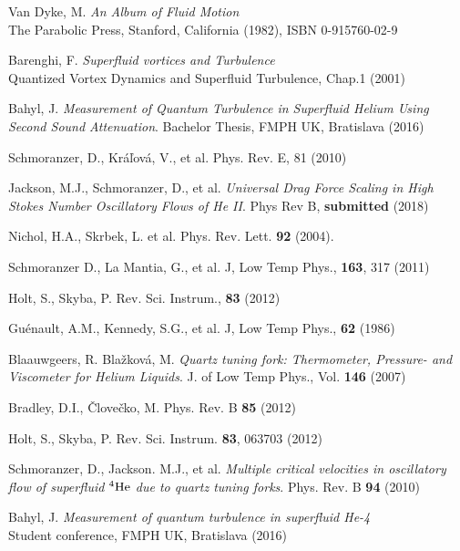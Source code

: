 \begin{thebibliography}{99}
	{\sc Van Dyke, M.}
	\emph{An Album of Fluid Motion}\\
	The Parabolic Press, Stanford, California (1982), ISBN 0-915760-02-9

	{\sc Barenghi, F.}
	\emph{Superfluid vortices and Turbulence}\\
	Quantized Vortex Dynamics and Superfluid Turbulence, Chap.1 (2001)

	{\sc Bahyl, J.}
	\emph{Measurement of Quantum Turbulence in Superfluid Helium Using Second Sound Attenuation}.
	Bachelor Thesis, FMPH UK, Bratislava (2016)

	{\sc Schmoranzer, D., Kráľová, V., et al.}
	\emph{}	Phys. Rev. E, 81 (2010)

	{\sc Jackson, M.J., Schmoranzer, D., et al.}
	\emph{Universal Drag Force Scaling in High Stokes Number Oscillatory Flows of He II}. Phys Rev B, \textbf{submitted} (2018)

	{\sc Nichol, H.A., Skrbek, L. et al.}
	\emph{} Phys. Rev. Lett. \textbf{92} (2004).

	{\sc Schmoranzer D., La Mantia, G., et al.}
	\emph{} J, Low Temp Phys., \textbf{163}, 317 (2011)


	{\sc Holt, S., Skyba, P.}
	\emph{} Rev. Sci. Instrum., \textbf{83} (2012)

	{\sc Guénault, A.M., Kennedy, S.G., et al.}
	\emph{} J, Low Temp Phys., \textbf{62} (1986)

	{\sc Blaauwgeers, R. Blažková, M.} 
	\emph{Quartz tuning fork: Thermometer, Pressure- and Viscometer for Helium Liquids}.
	J. of Low Temp Phys., Vol. \textbf{146} (2007)

	{\sc Bradley, D.I., Človečko, M.} 
	\emph{} Phys. Rev. B \textbf{85} (2012)

	{\sc Holt, S., Skyba, P.}
	\emph{} Rev. Sci. Instrum. \textbf{83}, 063703 (2012)

	{\sc Schmoranzer, D., Jackson. M.J., et al.}
	\emph{Multiple critical velocities in oscillatory flow of superfluid ${}^4\mathrm{He}$ due to quartz tuning forks}.
	Phys. Rev. B \textbf{94} (2010)

	{\sc Bahyl, J.}
	\emph{Measurement of quantum turbulence in superfluid He-4}\\
	Student conference, FMPH UK, Bratislava (2016)


\end{thebibliography}
